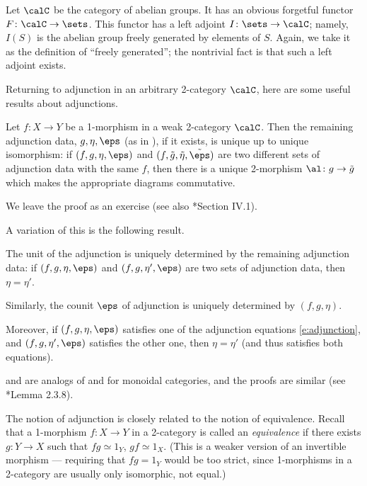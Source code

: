 \begin{example}\label{x:abelian-groups-duality}
  Let $\calC$ be the category of abelian groups. It has an obvious forgetful
  functor $F\colon \calC\to\sets$. This functor has a left adjoint
  $I\colon\sets\to \calC$; namely, $I(S)$ is the abelian group freely generated
  by elements of $S$. Again, we take it as the definition of ``freely
  generated''; the nontrivial fact is that such a left adjoint exists.
\end{example}


Returning to adjunction in an arbitrary 2-category $\calC$,
here are some useful results about adjunctions.

\begin{lemma}\label{l:adjunction-unique}
  Let $f\colon X\to Y$ be a 1-morphism in a weak 2-category $\calC$. Then
  the remaining adjunction data, $g, \eta, \eps$ \textup{(}as in
  \textup{)}, if it exists, is unique up to unique isomorphism: if
  $(f,g,\eta,\eps)$ and $(f, \tilde g, \tilde \eta, \tilde \eps)$ are two
  different sets of adjunction data with the same $f$, then there is a
  unique 2-morphism $\al\colon g\to \tilde g$ which makes the appropriate
  diagrams commutative.
\end{lemma}
We leave the proof as an exercise (see also *{Section IV.1}).

A variation of this is the following result.
\begin{lemma}\label{l:adjunction-unique2}
  The unit of the adjunction is uniquely determined by the remaining
  adjunction data: if $(f, g, \eta, \eps)$ and $(f, g, \eta', \eps)$ are two
  sets of adjunction data, then
  $\eta=\eta'$.

  Similarly, the counit $\eps$ of adjunction is uniquely determined by
  $(f,g, \eta)$.

  Moreover, if $(f, g, \eta, \eps)$ satisfies one of the adjunction equations
  \eqref{e:adjunction}, and $(f, g, \eta', \eps)$ satisfies the other one,
  then $\eta=\eta'$ \textup{(}and thus satisfies both equations\textup{)}.
\end{lemma}
 and  are analogs of
 and  for monoidal categories,
and the proofs are similar (see *{Lemma 2.3.8}).



The notion of adjunction is closely related to the notion of equivalence. Recall
that a 1-morphism $f\colon X\to Y$ in a 2-category is called an
\emph{equivalence} if there exists $g\colon
Y\to X$ such that $fg\simeq 1_Y$, $gf\simeq 1_X$. (This is a weaker version of
an invertible morphism --- requiring that $fg=1_Y$ would be too strict, since
1-morphisms in a 2-category are usually only isomorphic, not equal.)

